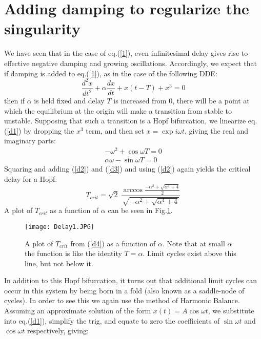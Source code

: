 \documentclass[12pt]{article}
\begin{document}
\section{Adding damping to regularize the singularity}

We have seen that in the case of eq.(\ref{1}), even infinitesimal delay gives rise to effective negative damping and growing oscillations. Accordingly, we expect that 
if damping is added to eq.(\ref{1}), as in the case of the following DDE:
\begin{equation}
\frac{d^2x}{dt^2}+\alpha \frac{dx}{dt}+x(t-T)+x^3 = 0
\label{d1} 
\end{equation}
then if $\alpha$ is held fixed and delay $T$ is increased from $0$, there will be a point at which the equilibrium at the origin will make a transition from stable to unstable.  Supposing that such a transition is a Hopf bifurcation, we linearize eq.(\ref{d1}) by dropping the $x^3$ term, and then set $x=\exp{i\omega t}$, giving the real and imaginary parts:
\begin{eqnarray}
\label{d2}
-{{\omega }^{2}}+\cos \omega T =0\\
\label{d3}
\alpha \omega -\sin \omega T =0
\end{eqnarray}   
Squaring and adding (\ref{d2}) and (\ref{d3}) and using (\ref{d2}) again yields the critical delay for a Hopf:
\begin{equation}
{{T}_{crit}}=\sqrt{2}~\displaystyle{\frac{\arccos 
		\displaystyle{
	\frac{-{{\alpha }^{2}}+\sqrt{{{\alpha }^{4}}+4}}{2}}}
{\displaystyle{{\sqrt{-{{\alpha }^{2}}+\sqrt{{{\alpha }^{4}}+4}}}}}}
\label{d4}
\end{equation}
A plot of $T_{crit}$ as a function of $\alpha$ can be seen in Fig.\ref{fig:alpha1}.
\begin{figure}[h!]
	\begin{center}
		\texttt{[image: Delay1.JPG]}
		\caption{A plot of $T_{crit}$ from (\ref{d4})  as a function of $\alpha$. Note that at small $\alpha$ the function is like the identity $T=\alpha$. Limit cycles exist above this line, but not below it.}
		\label{fig:alpha1}
	\end{center}
\end{figure}

In addition to this Hopf bifurcation, it turns out that additional limit cycles can occur in this system by being born in a fold (also known as a saddle-node of cycles).  In order to see this we again use the method of Harmonic Balance.
Assuming an approximate solution of the form $x(t) = A \cos \omega t$, we substitute into eq.(\ref{d1}), simplify the trig, and equate to zero the coefficients of $\sin \omega t$ and $\cos\omega t$ respectively, giving:
\end{document}
